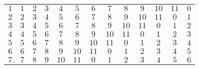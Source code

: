 \documentclass[12pt, a4paper]{article}
\begin{document}
\begin{solution}
\begin{center}
\begin{table}[h]
\begin{tabular}{ccccccccccccc}
\multicolumn{1}{c|}{$1$}  & \multicolumn{1}{c|}{$1$}  & \multicolumn{1}{c|}{$2$}  & \multicolumn{1}{c|}{$3$}  & \multicolumn{1}{c|}{$4$}  & \multicolumn{1}{c|}{$5$}  & \multicolumn{1}{c|}{$6$}  & \multicolumn{1}{c|}{$7$}  & \multicolumn{1}{c|}{$8$}  & \multicolumn{1}{c|}{$9$}  & \multicolumn{1}{c|}{$10$} & \multicolumn{1}{c|}{$11$} & \multicolumn{1}{c|}{$0$}  \\ \cline{2-13} 
\multicolumn{1}{c|}{$2$}  & \multicolumn{1}{c|}{$2$}  & \multicolumn{1}{c|}{$3$}  & \multicolumn{1}{c|}{$4$}  & \multicolumn{1}{c|}{$5$}  & \multicolumn{1}{c|}{$6$}  & \multicolumn{1}{c|}{$7$}  & \multicolumn{1}{c|}{$8$}  & \multicolumn{1}{c|}{$9$}  & \multicolumn{1}{c|}{$10$} & \multicolumn{1}{c|}{$11$} & \multicolumn{1}{c|}{$0$}  & \multicolumn{1}{c|}{$1$}  \\ \cline{2-13} 
\multicolumn{1}{c|}{$3$}  & \multicolumn{1}{c|}{$3$}  & \multicolumn{1}{c|}{$4$}  & \multicolumn{1}{c|}{$5$}  & \multicolumn{1}{c|}{$6$}  & \multicolumn{1}{c|}{$7$}  & \multicolumn{1}{c|}{$8$}  & \multicolumn{1}{c|}{$9$}  & \multicolumn{1}{c|}{$10$} & \multicolumn{1}{c|}{$11$} & \multicolumn{1}{c|}{$0$}  & \multicolumn{1}{c|}{$1$}  & \multicolumn{1}{c|}{$2$}  \\ \cline{2-13} 
\multicolumn{1}{c|}{$4$}  & \multicolumn{1}{c|}{$4$}  & \multicolumn{1}{c|}{$5$}  & \multicolumn{1}{c|}{$6$}  & \multicolumn{1}{c|}{$7$}  & \multicolumn{1}{c|}{$8$}  & \multicolumn{1}{c|}{$9$}  & \multicolumn{1}{c|}{$10$} & \multicolumn{1}{c|}{$11$} & \multicolumn{1}{c|}{$0$}  & \multicolumn{1}{c|}{$1$}  & \multicolumn{1}{c|}{$2$}  & \multicolumn{1}{c|}{$3$}  \\ \cline{2-13} 
\multicolumn{1}{c|}{$5$}  & \multicolumn{1}{c|}{$5$}  & \multicolumn{1}{c|}{$6$}  & \multicolumn{1}{c|}{$7$}  & \multicolumn{1}{c|}{$8$}  & \multicolumn{1}{c|}{$9$}  & \multicolumn{1}{c|}{$10$} & \multicolumn{1}{c|}{$11$} & \multicolumn{1}{c|}{$0$}  & \multicolumn{1}{c|}{$1$}  & \multicolumn{1}{c|}{$2$}  & \multicolumn{1}{c|}{$3$}  & \multicolumn{1}{c|}{$4$}  \\ \cline{2-13} 
\multicolumn{1}{c|}{$6$}  & \multicolumn{1}{c|}{$6$}  & \multicolumn{1}{c|}{$7$}  & \multicolumn{1}{c|}{$8$}  & \multicolumn{1}{c|}{$9$}  & \multicolumn{1}{c|}{$10$} & \multicolumn{1}{c|}{$11$} & \multicolumn{1}{c|}{$0$}  & \multicolumn{1}{c|}{$1$}  & \multicolumn{1}{c|}{$2$}  & \multicolumn{1}{c|}{$3$}  & \multicolumn{1}{c|}{$4$}  & \multicolumn{1}{c|}{$5$}  \\ \cline{2-13} 
\multicolumn{1}{l|}{$7$}  & \multicolumn{1}{c|}{$7$}  & \multicolumn{1}{c|}{$8$}  & \multicolumn{1}{c|}{$9$}  & \multicolumn{1}{c|}{$10$} & \multicolumn{1}{c|}{$11$} & \multicolumn{1}{c|}{$0$}  & \multicolumn{1}{c|}{$1$}  & \multicolumn{1}{c|}{$2$}  & \multicolumn{1}{c|}{$3$}  & \multicolumn{1}{c|}{$4$}  & \multicolumn{1}{c|}{$5$}  & \multicolumn{1}{c|}{$6$}  \\ \cline{2-13} 

\end{tabular}
\end{table}
\end{center}
\end{solution}
\end{document}
